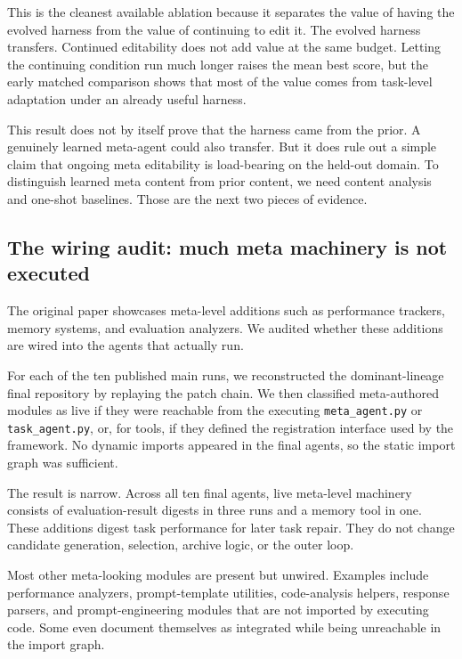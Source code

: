 \documentclass[11pt]{article}
\begin{document}
This is the cleanest available ablation because it separates the value of having the evolved harness from the value of continuing to edit it. The evolved harness transfers. Continued editability does not add value at the same budget. Letting the continuing condition run much longer raises the mean best score, but the early matched comparison shows that most of the value comes from task-level adaptation under an already useful harness.

This result does not by itself prove that the harness came from the prior. A genuinely learned meta-agent could also transfer. But it does rule out a simple claim that ongoing meta editability is load-bearing on the held-out domain. To distinguish learned meta content from prior content, we need content analysis and one-shot baselines. Those are the next two pieces of evidence.

\subsection{The wiring audit: much meta machinery is not executed}\label{the-wiring-audit-much-meta-machinery-is-not-executed}

The original paper showcases meta-level additions such as performance trackers, memory systems, and evaluation analyzers. We audited whether these additions are wired into the agents that actually run.

For each of the ten published main runs, we reconstructed the dominant-lineage final repository by replaying the patch chain. We then classified meta-authored modules as live if they were reachable from the executing \texttt{meta\_agent.py} or \texttt{task\_agent.py}, or, for tools, if they defined the registration interface used by the framework. No dynamic imports appeared in the final agents, so the static import graph was sufficient.

The result is narrow. Across all ten final agents, live meta-level machinery consists of evaluation-result digests in three runs and a memory tool in one. These additions digest task performance for later task repair. They do not change candidate generation, selection, archive logic, or the outer loop.

Most other meta-looking modules are present but unwired. Examples include performance analyzers, prompt-template utilities, code-analysis helpers, response parsers, and prompt-engineering modules that are not imported by executing code. Some even document themselves as integrated while being unreachable in the import graph.
\end{document}
